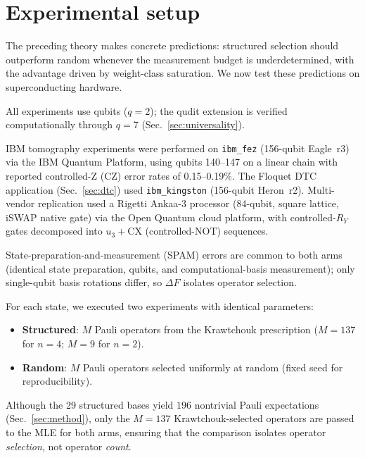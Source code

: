 \documentclass[twocolumn,prx,aps,superscriptaddress,longbibliography,floatfix]{revtex4-2}
\begin{document}
\section{Experimental setup}
\label{sec:experiment}

The preceding theory makes concrete predictions: structured
selection should outperform random whenever the measurement budget
is underdetermined, with the advantage driven by weight-class
saturation.  We now test these predictions on superconducting
hardware.

All experiments use qubits ($q = 2$); the qudit extension
is verified computationally through $q = 7$
(Sec.~\ref{sec:universality}).

IBM tomography experiments were performed on \texttt{ibm\_fez}
(156-qubit Eagle~r3)~\cite{Kim2023} via the IBM Quantum Platform,
using qubits 140--147 on a linear chain with reported controlled-Z (CZ) error rates
of 0.15--0.19\%.
The Floquet DTC application (Sec.~\ref{sec:dtc}) used
\texttt{ibm\_kingston} (156-qubit Heron~r2).
Multi-vendor replication used a Rigetti Ankaa-3 processor
(84-qubit, square lattice, iSWAP native gate) via the Open Quantum
cloud platform, with controlled-$R_Y$ gates decomposed
into $u_3{+}\text{CX}$ (controlled-NOT) sequences.

State-preparation-and-measurement (SPAM) errors are common to both arms (identical state preparation,
qubits, and computational-basis measurement); only single-qubit
basis rotations differ, so $\Delta F$ isolates operator selection.

For each state, we executed two experiments with identical parameters:
\begin{itemize}
\item \textbf{Structured}: $M$ Pauli operators from the Krawtchouk
prescription ($M = 137$ for $n = 4$; $M = 9$ for $n = 2$).
\item \textbf{Random}: $M$ Pauli operators selected uniformly at
random (fixed seed for reproducibility).
\end{itemize}
Although the 29 structured bases yield $196$ nontrivial Pauli
expectations (Sec.~\ref{sec:method}), only the $M = 137$
Krawtchouk-selected operators are passed to the MLE for both arms,
ensuring that the comparison isolates operator \emph{selection},
not operator \emph{count}.
\end{document}
